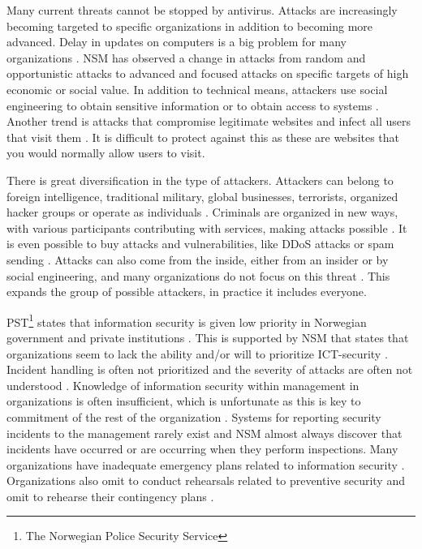 Many current threats cannot be stopped by antivirus. Attacks are increasingly becoming targeted to specific organizations in addition to becoming more advanced. Delay in updates on computers is a big problem for many organizations \cite{NorCERT2Kvartal2012}. \acs{NSM} has observed a change in attacks from random and opportunistic attacks to advanced and focused attacks on specific targets of high economic or social value. In addition to technical means, attackers use social engineering to obtain sensitive information or to obtain access to systems \cite{NSMRapport}. Another trend is attacks that compromise legitimate websites and infect all users that visit them \cite{NSMRapport2012}. It is difficult to protect against this as these are websites that you would normally allow users to visit.

There is great diversification in the type of attackers. Attackers can belong to foreign intelligence, traditional military, global businesses, terrorists, organized hacker groups or operate as individuals \cite{samordnaVurdering}. Criminals are organized in new ways, with various participants contributing with services, making attacks possible \cite{KriposTrender}. It is even possible to buy attacks and vulnerabilities, like \ac{DDoS} attacks or spam sending \cite{NorCERT2Kvartal2012}. Attacks can also come from the inside, either from an insider or by social engineering, and many organizations do not focus on this threat \cite{NSMRapport2012}. This expands the group of possible attackers, in practice it includes everyone. 

PST\footnote{The Norwegian Police Security Service} states that information security is given low priority in Norwegian government and private institutions \cite{PSTvurdering}. This is supported by \acs{NSM} that states that organizations seem to lack the ability and/or will to prioritize ICT-security \cite{NSMmelding}. Incident handling is often not prioritized and the severity of attacks are often not understood \cite{NorCERT2Kvartal2012}. Knowledge of information security within management in organizations is often insufficient, which is unfortunate as this is key to commitment of the rest of the organization \cite{NorCERT3Kvartal2012}. Systems for reporting security incidents to the management rarely exist and \acs{NSM} almost always discover that incidents have occurred or are occurring when they perform inspections. Many organizations have inadequate emergency plans related to information security \cite{NSMRapport}. Organizations also omit to conduct rehearsals related to preventive security and omit to rehearse their contingency plans \cite{NSMRapport2012}.

